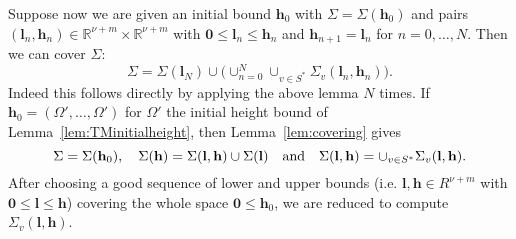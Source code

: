 Suppose now we are given an initial bound $\mathbf{h}_0$ with $\Sigma=\Sigma(\mathbf{h}_0)$ and pairs $(\mathbf{l}_n,\mathbf{h}_n)\in \mathbb{R}^{\nu + m}\times \mathbb{R}^{\nu + m}$ with $\mathbf{0}\leq \mathbf{l}_n\leq \mathbf{h}_n$ and $\mathbf{h}_{n+1}=\mathbf{l}_{n}$ for $n=0,\dotsc,N$. Then we can cover $\Sigma$: $$\Sigma=\Sigma(\mathbf{l}_{N})\cup\bigl(\cup_{n=0}^{N}\cup_{v\in S^*}\Sigma_v(\mathbf{l}_n,\mathbf{h}_n)\bigl).$$
Indeed this follows directly by applying the above lemma $N$ times. If $\mathbf{h}_0=(\Omega',\dotsc,\Omega')$ for $\Omega'$ the initial height bound of Lemma~\ref{lem:TMinitialheight}, then Lemma~\ref{lem:covering} gives  $$\Sigma=\Sigma(\mathbf{h}_0), \quad \Sigma(\mathbf{h})=\Sigma(\mathbf{l},\mathbf{h})\cup \Sigma(\mathbf{l}) \quad \textnormal{and} \quad \Sigma(\mathbf{l},\mathbf{h})=\cup_{v\in S^*}\Sigma_v(\mathbf{l},\mathbf{h}).$$
After choosing a good sequence of lower and upper bounds (i.e. $\mathbf{l},\mathbf{h}\in R^{\nu+m}$ with $\mathbf{0}\leq \mathbf{l}\leq \mathbf{h}$) covering the whole space $\mathbf{0}\leq \mathbf{h}_0$, we are reduced to compute $\Sigma_v(\mathbf{l},\mathbf{h})$.
%
%
%
%
%
%
%

